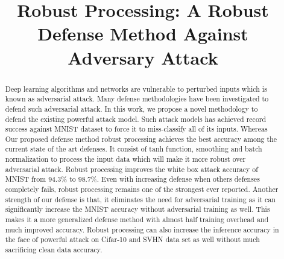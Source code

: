 \documentclass[conference]{IEEEtran}
\begin{document}
\title{Robust Processing: A Robust Defense Method Against Adversary Attack}


\maketitle

\begin{abstract}
Deep learning algorithms and networks are vulnerable to perturbed inputs which is known as adversarial attack. Many defense methodologies have been investigated to defend such adversarial attack. In this work, we propose a novel methodology to defend the existing powerful attack model. Such attack models has achieved record success against MNIST dataset to force it to miss-classify all of its inputs. Whereas Our proposed defense method robust processing achieves the best accuracy among the current state of the art defenses. It consist of tanh function, smoothing and batch normalization to process the input data which will make it more robust over adversarial attack. Robust processing improves the white box attack accuracy of MNIST from 94.3\% to 98.7\%. Even with increasing defense when others defenses completely fails, robust processing remains one of the strongest ever reported. Another strength of our defense is that, it eliminates the need for adversarial training as it can significantly increase the MNIST accuracy without adversarial training as well. This makes it a more generalized defense method with almost half training overhead and much improved accuracy. Robust processing can also increase the inference accuracy in the face of powerful attack on Cifar-10 and SVHN data set as well without much sacrificing clean data accuracy.
\end{abstract}
\end{document}

